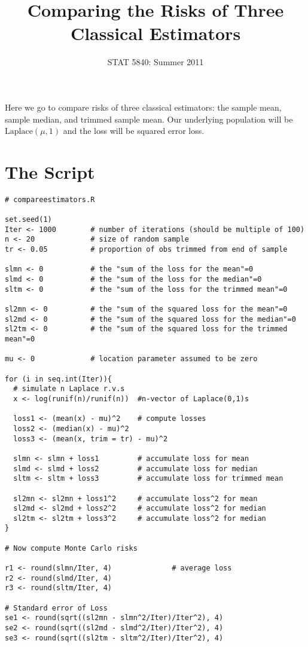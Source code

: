 \documentclass[11pt,english]{article}
\title{Comparing the Risks of Three Classical Estimators}
\date{STAT 5840: Summer 2011}
\begin{document}
\maketitle

\thispagestyle{empty}

Here we go to compare risks of three classical estimators: the sample mean, sample median, and trimmed sample mean.  Our underlying population will be $\mathrm{Laplace}(\mu,1)$ and the loss will be squared error loss.

\section*{The Script}
\label{sec-1}


\begin{verbatim}
# compareestimators.R

set.seed(1)
Iter <- 1000        # number of iterations (should be multiple of 100)
n <- 20             # size of random sample
tr <- 0.05          # proportion of obs trimmed from end of sample

slmn <- 0           # the "sum of the loss for the mean"=0
slmd <- 0           # the "sum of the loss for the median"=0
sltm <- 0           # the "sum of the loss for the trimmed mean"=0

sl2mn <- 0          # the "sum of the squared loss for the mean"=0
sl2md <- 0          # the "sum of the squared loss for the median"=0
sl2tm <- 0          # the "sum of the squared loss for the trimmed mean"=0

mu <- 0             # location parameter assumed to be zero

for (i in seq.int(Iter)){
  # simulate n Laplace r.v.s
  x <- log(runif(n)/runif(n))  #n-vector of Laplace(0,1)s
                             
  loss1 <- (mean(x) - mu)^2    # compute losses
  loss2 <- (median(x) - mu)^2
  loss3 <- (mean(x, trim = tr) - mu)^2

  slmn <- slmn + loss1         # accumulate loss for mean
  slmd <- slmd + loss2         # accumulate loss for median
  sltm <- sltm + loss3         # accumulate loss for trimmed mean

  sl2mn <- sl2mn + loss1^2     # accumulate loss^2 for mean
  sl2md <- sl2md + loss2^2     # accumulate loss^2 for median
  sl2tm <- sl2tm + loss3^2     # accumulate loss^2 for median
}

# Now compute Monte Carlo risks

r1 <- round(slmn/Iter, 4)              # average loss
r2 <- round(slmd/Iter, 4)
r3 <- round(sltm/Iter, 4)

# Standard error of Loss
se1 <- round(sqrt((sl2mn - slmn^2/Iter)/Iter^2), 4)
se2 <- round(sqrt((sl2md - slmd^2/Iter)/Iter^2), 4)
se3 <- round(sqrt((sl2tm - sltm^2/Iter)/Iter^2), 4)
\end{verbatim}
\end{document}
